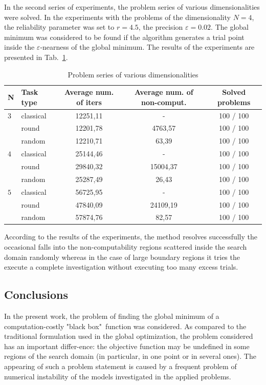 \documentclass[runningheads]{llncs}
\begin{document}
In the second series of experiments, the problem series of various dimensionalities were solved. In the experiments with the problems of the dimensionality $N=4$, the reliability parameter was set to $r=4.5$, the precision $\varepsilon=0.02$. The global minimum was considered to be found if the algorithm generates a trial point inside the $\varepsilon$-nearness of the global minimum. The results of the experiments are presented in Tab.~\ref{tab2}.

\begin{table}
\caption{Problem series of various dimensionalities}\label{tab2}
\begin{tabular}{|l|l|c|c|c|}
\hline
 N &  Task type & Average num. of iters & Average num. of non-comput. & Solved problems \\
\hline
$3$ & classical & 12251,11 & - & 100 / 100 \\
$ $ & round & 12201,78 & 4763,57 & 100 / 100 \\
$ $ & random & 12210,71 & 63,39 & 100 / 100 \\
\hline
$4$ & classical & 25144,46 & - & 100 / 100 \\
$ $ & round & 29840,32 & 15004,37  & 100 / 100 \\
$ $ & random & 25287,49 & 26,43 & 100 / 100 \\
\hline
$5$ & classical & 56725,95 & - & 100 / 100 \\
$ $ & round & 47840,09 & 24109,19 & 100 / 100\\
$ $ & random & 57874,76 & 82,57 & 100 / 100\\
\hline
\end{tabular}
\end{table}

According to the results of the experiments, the method resolves successfully the occasional falls into the non-computability regions scattered inside the search domain randomly whereas in the case of large boundary regions it tries the execute a complete investigation without executing too many excess trials.

\subsection{Conclusions}
In the present work, the problem of finding the global minimum of a computation-costly "black box"\ function was considered. As compared to the traditional formulation used in the global optimization, the problem considered has an important differ-ence: the objective function may be undefined in some regions of the search domain (in particular, in one point or in several ones). The appearing of such a problem statement is caused by a frequent problem of numerical instability of the models investigated in the applied problems.
\end{document}
